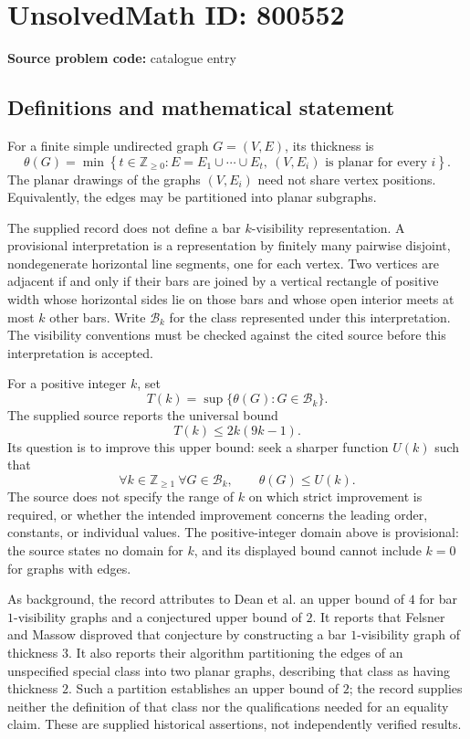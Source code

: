 \documentclass[11pt]{article}
\newcommand{\Z}{\mathbb{Z}}
\begin{document}
\section*{UnsolvedMath ID: 800552}
\textbf{Source problem code:} catalogue entry
\subsection{Definitions and mathematical statement}
For a finite simple undirected graph \(G=(V,E)\), its thickness is
\[
\theta(G)=\min\left\{t\in\Z_{\geq 0}:E=E_1\cup\cdots\cup E_t,\ (V,E_i)\text{ is planar for every }i\right\}.
\]
The planar drawings of the graphs \((V,E_i)\) need not share vertex positions. Equivalently, the edges may be partitioned into planar subgraphs.

The supplied record does not define a bar \(k\)-visibility representation. A provisional interpretation is a representation by finitely many pairwise disjoint, nondegenerate horizontal line segments, one for each vertex. Two vertices are adjacent if and only if their bars are joined by a vertical rectangle of positive width whose horizontal sides lie on those bars and whose open interior meets at most \(k\) other bars. Write \(\mathcal B_k\) for the class represented under this interpretation. The visibility conventions must be checked against the cited source before this interpretation is accepted.

For a positive integer \(k\), set
\[
T(k)=\sup\{\theta(G):G\in\mathcal B_k\}.
\]
The supplied source reports the universal bound
\[
T(k)\leq 2k(9k-1).
\]
Its question is to improve this upper bound: seek a sharper function \(U(k)\) such that
\[
\forall k\in\Z_{\geq1}\ \forall G\in\mathcal B_k,\qquad \theta(G)\leq U(k).
\]
The source does not specify the range of \(k\) on which strict improvement is required, or whether the intended improvement concerns the leading order, constants, or individual values. The positive-integer domain above is provisional: the source states no domain for \(k\), and its displayed bound cannot include \(k=0\) for graphs with edges.

As background, the record attributes to Dean et al. an upper bound of \(4\) for bar \(1\)-visibility graphs and a conjectured upper bound of \(2\). It reports that Felsner and Massow disproved that conjecture by constructing a bar \(1\)-visibility graph of thickness \(3\). It also reports their algorithm partitioning the edges of an unspecified special class into two planar graphs, describing that class as having thickness \(2\). Such a partition establishes an upper bound of \(2\); the record supplies neither the definition of that class nor the qualifications needed for an equality claim. These are supplied historical assertions, not independently verified results.
\end{document}
